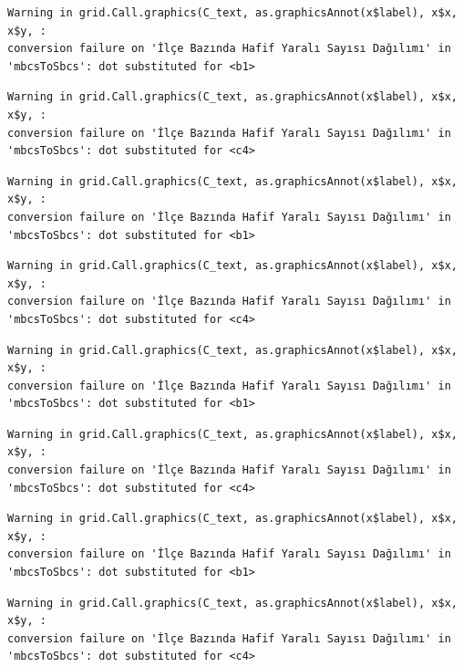 \documentclass[
  11pt,
  a4paper,
  DIV=11,
  numbers=noendperiod]{scrartcl}
\begin{document}
\begin{verbatim}
Warning in grid.Call.graphics(C_text, as.graphicsAnnot(x$label), x$x, x$y, :
conversion failure on 'İlçe Bazında Hafif Yaralı Sayısı Dağılımı' in
'mbcsToSbcs': dot substituted for <b1>
\end{verbatim}

\begin{verbatim}
Warning in grid.Call.graphics(C_text, as.graphicsAnnot(x$label), x$x, x$y, :
conversion failure on 'İlçe Bazında Hafif Yaralı Sayısı Dağılımı' in
'mbcsToSbcs': dot substituted for <c4>
\end{verbatim}

\begin{verbatim}
Warning in grid.Call.graphics(C_text, as.graphicsAnnot(x$label), x$x, x$y, :
conversion failure on 'İlçe Bazında Hafif Yaralı Sayısı Dağılımı' in
'mbcsToSbcs': dot substituted for <b1>
\end{verbatim}

\begin{verbatim}
Warning in grid.Call.graphics(C_text, as.graphicsAnnot(x$label), x$x, x$y, :
conversion failure on 'İlçe Bazında Hafif Yaralı Sayısı Dağılımı' in
'mbcsToSbcs': dot substituted for <c4>
\end{verbatim}

\begin{verbatim}
Warning in grid.Call.graphics(C_text, as.graphicsAnnot(x$label), x$x, x$y, :
conversion failure on 'İlçe Bazında Hafif Yaralı Sayısı Dağılımı' in
'mbcsToSbcs': dot substituted for <b1>
\end{verbatim}

\begin{verbatim}
Warning in grid.Call.graphics(C_text, as.graphicsAnnot(x$label), x$x, x$y, :
conversion failure on 'İlçe Bazında Hafif Yaralı Sayısı Dağılımı' in
'mbcsToSbcs': dot substituted for <c4>
\end{verbatim}

\begin{verbatim}
Warning in grid.Call.graphics(C_text, as.graphicsAnnot(x$label), x$x, x$y, :
conversion failure on 'İlçe Bazında Hafif Yaralı Sayısı Dağılımı' in
'mbcsToSbcs': dot substituted for <b1>
\end{verbatim}

\begin{verbatim}
Warning in grid.Call.graphics(C_text, as.graphicsAnnot(x$label), x$x, x$y, :
conversion failure on 'İlçe Bazında Hafif Yaralı Sayısı Dağılımı' in
'mbcsToSbcs': dot substituted for <c4>
\end{verbatim}
\end{document}
